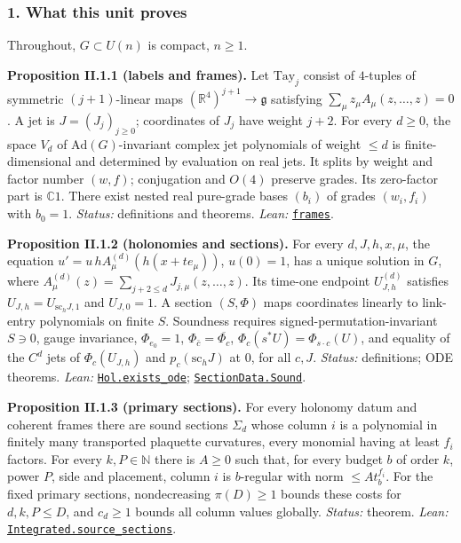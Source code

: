 \documentclass[
  letterpaper,
  11pt]{article}
\begin{document}
\subsubsection{1. What this unit proves}\label{what-this-unit-proves-1}

Throughout, \(G\subset U(n)\) is compact, \(n\ge1\).

\textbf{Proposition II.1.1 (labels and frames).} Let \(\mathrm{Tay}_j\)
consist of \(4\)-tuples of symmetric \((j+1)\)-linear maps
\((\mathbb R^4)^{j+1}\to\mathfrak g\) satisfying
\(\sum_\mu z_\mu A_\mu(z,\ldots,z)=0\). A jet is \(J=(J_j)_{j\ge0}\);
coordinates of \(J_j\) have weight \(j+2\). For every \(d\ge0\), the
space \(V_d\) of \(\mathrm{Ad}(G)\)-invariant complex jet polynomials of
weight \(\le d\) is finite-dimensional and determined by evaluation on
real jets. It splits by weight and factor number \((w,f)\); conjugation
and \(O(4)\) preserve grades. Its zero-factor part is \(\mathbb C1\).
There exist nested real pure-grade bases \((b_i)\) of grades
\((w_i,f_i)\) with \(b_0=1\). \emph{Status:} definitions and theorems.
\emph{Lean:}
\href{https://github.com/yang-mills-group/OpenAI-YM-20261028/blob/3456e5e75cf8d4cd558955a5c7638fba2d68f464/YM/Labels/Basis.lean\#L107-L111}{\texttt{frames}}.

\textbf{Proposition II.1.2 (holonomies and sections).} For every
\(d,J,h,x,\mu\), the equation \(u'=u\,hA^{(d)}_\mu(h(x+te_\mu))\),
\(u(0)=1\), has a unique solution in \(G\), where
\(A^{(d)}_\mu(z)=\sum_{j+2\le d}J_{j,\mu}(z,\ldots,z)\). Its time-one
endpoint \(U^{(d)}_{J,h}\) satisfies \(U_{J,h}=U_{\mathrm{sc}_hJ,1}\)
and \(U_{J,0}=1\). A section \((S,\Phi)\) maps coordinates linearly to
link-entry polynomials on finite \(S\). Soundness requires
signed-permutation-invariant \(S\ni0\), gauge invariance,
\(\Phi_{e_0}=1\), \(\Phi_{\bar c}=\overline{\Phi_c}\),
\(\Phi_c(s^*U)=\Phi_{s\cdot c}(U)\), and equality of the \(C^d\) jets of
\(\Phi_c(U_{J,h})\) and \(p_c(\mathrm{sc}_hJ)\) at \(0\), for all
\(c,J\). \emph{Status:} definitions; ODE theorems. \emph{Lean:}
\href{https://github.com/yang-mills-group/OpenAI-YM-20261028/blob/3456e5e75cf8d4cd558955a5c7638fba2d68f464/YM/Source/ODE.lean\#L162-L168}{\texttt{Hol.exists\_ode}};
\href{https://github.com/yang-mills-group/OpenAI-YM-20261028/blob/3456e5e75cf8d4cd558955a5c7638fba2d68f464/YM/Source/Local.lean\#L140-L147}{\texttt{SectionData.Sound}}.

\textbf{Proposition II.1.3 (primary sections).} For every holonomy datum
and coherent frames there are sound sections \(\Sigma_d\) whose column
\(i\) is a polynomial in finitely many transported plaquette curvatures,
every monomial having at least \(f_i\) factors. For every
\(k,P\in\mathbb N\) there is \(A\ge0\) such that, for every budget \(b\)
of order \(k\), power \(P\), side and placement, column \(i\) is
\(b\)-regular with norm \(\le At_b^{f_i}\). For the fixed primary
sections, nondecreasing \(\pi(D)\ge1\) bounds these costs for
\(d,k,P\le D\), and \(c_d\ge1\) bounds all column values globally.
\emph{Status:} theorem. \emph{Lean:}
\href{https://github.com/yang-mills-group/OpenAI-YM-20261028/blob/3456e5e75cf8d4cd558955a5c7638fba2d68f464/YM/Integrated.lean\#L216-L219}{\texttt{Integrated.source\_sections}}.
\end{document}
